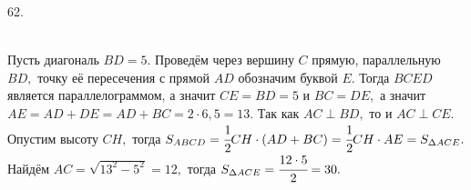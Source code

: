 62. \begin{figure}[ht!]
\end{figure}\\
Пусть диагональ $BD=5.$ Проведём через вершину $C$ прямую, параллельную $BD,$ точку её пересечения с прямой $AD$ обозначим буквой $E.$ Тогда $BCED$ является параллелограммом, а значит $CE=BD=5$ и $BC=DE,$ а значит $AE=AD+DE=AD+BC=2\cdot6,5=13.$ Так как $AC\perp BD,$ то и $AC\perp CE.$
Опустим высоту $CH,$ тогда $S_{ABCD}=\cfrac{1}{2} CH\cdot (AD+BC)=\cfrac{1}{2} CH\cdot AE=S_{\Delta ACE}.$ Найдём $AC=\sqrt{13^2-5^2}=12,$ тогда $S_{\Delta ACE}=\cfrac{12\cdot5}{2}=30.$\\

